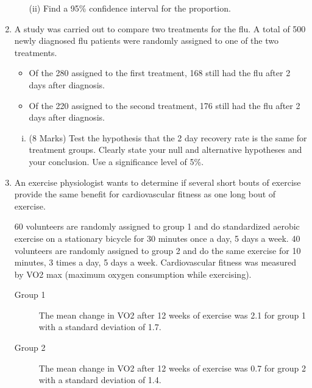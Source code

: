 \documentclass[a4paper,12pt]{article}
\begin{document}
\begin{enumerate}
\begin{itemize}
	\item[(ii)]  Find a 95\% confidence interval for the proportion. 					
\end{itemize}


 \item 
A study was carried out to compare two treatments for the flu. A total of 500
newly diagnosed flu patients were randomly assigned to one of the two treatments.
\begin{itemize}
	\item Of the 280 assigned to the first treatment, 168 still had the flu after 2 days after
	diagnosis. \item Of the 220 assigned to the second treatment, 176 still had the flu after 2
	days after diagnosis. \end{itemize} 
	

\begin{enumerate}[(i)]
\item (8 Marks) Test the hypothesis that the 2 day recovery rate is the same for treatment groups. Clearly state your null and alternative hypotheses and your conclusion. Use a significance level of 5\%.
\end{enumerate}


\item
An exercise physiologist wants to determine if several short bouts of exercise provide the same benefit for cardiovascular fitness as one long bout of exercise. 

60 volunteers are randomly assigned to group 1 and do standardized aerobic exercise on a stationary bicycle for 30 minutes once a day, 5 days a week. 40 volunteers are randomly assigned to group 2 and do the same exercise for 10 minutes, 3 times a day, 5 days a week. Cardiovascular fitness was measured by VO2 max (maximum oxygen consumption while exercising). 

\begin{description}
	\item[Group 1] The mean change in VO2 after 12 weeks of exercise was 2.1 for group 1 with a standard deviation of 1.7.
	\item[Group 2] The mean change in VO2 after 12 weeks of exercise was 0.7 for group 2 with a standard deviation of 1.4. 
\end{description}


\end{enumerate}
\end{document}
